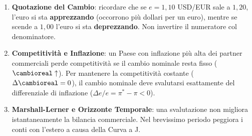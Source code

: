 \begin{esame}
\begin{enumerate}
    \item \textbf{Quotazione del Cambio}: ricordare che se $e = 1{,}10$ USD/EUR sale a $1{,}20$, l'euro si sta \textbf{apprezzando} (occorrono più dollari per un euro), mentre se scende a $1{,}00$ l'euro si sta \textbf{deprezzando}. Non invertire il numeratore col denominatore.
    \item \textbf{Competitività e Inflazione}: un Paese con inflazione più alta dei partner commerciali perde competitività se il cambio nominale resta fisso ($\cambioreal \uparrow$). Per mantenere la competitività costante ($\Delta \cambioreal = 0$), il cambio nominale deve svalutarsi esattamente del differenziale di inflazione ($\Delta e / e = \pi^* - \pi < 0$).
    \item \textbf{Marshall-Lerner e Orizzonte Temporale}: una svalutazione non migliora istantaneamente la bilancia commerciale. Nel brevissimo periodo peggiora i conti con l'estero a causa della Curva a J.
\end{enumerate}
\end{esame}
